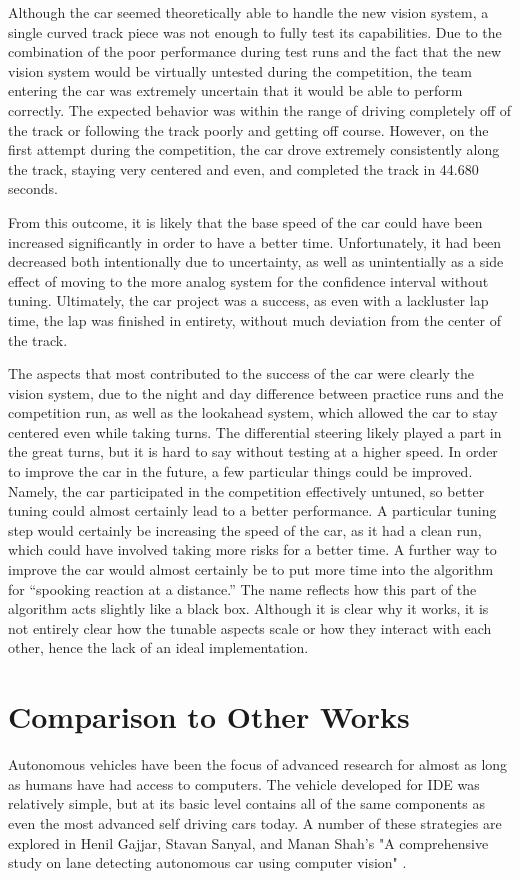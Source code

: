\documentclass[conference]{IEEEtran}
\begin{document}
    Although the car seemed theoretically able to handle the new vision system, a single curved track piece was not enough to fully test its capabilities.
    Due to the combination of the poor performance during test runs and the fact that the new vision system would be virtually untested during the competition, the team entering the car
    was extremely uncertain that it would be able to perform correctly.
    The expected behavior was within the range of driving completely off of the track or following the track poorly and getting off course.
    However, on the first attempt during the competition, the car drove extremely consistently along the track, staying very centered and even, and completed the track in 44.680 seconds.

    From this outcome, it is likely that the base speed of the car could have been increased significantly in order to have a better time. Unfortunately, it had been decreased both intentionally
    due to uncertainty, as well as unintentially as a side effect of moving to the more analog system for the confidence interval without tuning. Ultimately, the car project was a success, as even
    with a lackluster lap time, the lap was finished in entirety, without much deviation from the center of the track.

    The aspects that most contributed to the success of the car were clearly the vision system, due to the night and day difference between practice runs and the competition run, as well as the lookahead system,
    which allowed the car to stay centered even while taking turns. The differential steering likely played a part in the great turns, but it is hard to say without testing at a higher speed. In order to improve
    the car in the future, a few particular things could be improved. Namely, the car participated in the competition effectively untuned, so better tuning could almost certainly lead to a better performance.
    A particular tuning step would certainly be increasing the speed of the car, as it had a clean run, which could have involved taking more risks for a better time.
    A further way to improve the car would almost certainly be to put more time into the algorithm for ``spooking reaction at a distance.''
    The name reflects how this part of the algorithm acts slightly like a black box. 
    Although it is clear why it works, it is not entirely clear how the tunable aspects scale or how they interact with each other, hence the lack of an ideal implementation.

\section{Comparison to Other Works}
    Autonomous vehicles have been the focus of advanced research for almost as
    long as humans have had access to computers. The vehicle developed for IDE
    was relatively simple, but at its basic level contains all of the same
    components as even the most advanced self driving cars today. A number of
    these strategies are explored in Henil Gajjar, Stavan Sanyal, and Manan
    Shah's "A comprehensive study on lane detecting autonomous car using
    computer vision" \cite{b2}.
    
\end{document}
